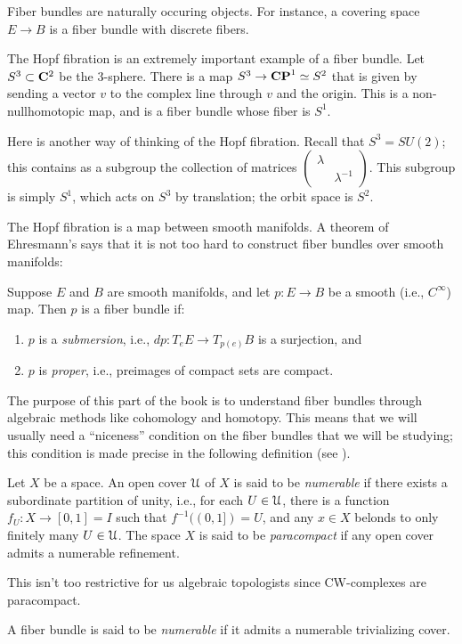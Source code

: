Fiber bundles are naturally occuring objects.
For instance, a covering space $E\to B$ is a fiber bundle with discrete fibers. 
\begin{example}
    The Hopf fibration is an extremely important example of a fiber bundle.
    Let $S^3\subset \mathbf C^2$ be the $3$-sphere.
    There is a map $S^3\to \mathbf{CP}^1 \simeq S^2$ that is given by sending a vector $v$ to the
    complex line through $v$ and the origin.
    This is a non-nullhomotopic map, and is a fiber bundle whose fiber is $S^1$.
    
    Here is another way of thinking of the Hopf fibration.
    Recall that $S^3 = SU(2)$; this contains as a subgroup
    the collection of matrices $\begin{pmatrix}\lambda & \\ & \lambda^{-1}\end{pmatrix}$.
	This subgroup is simply $S^1$, which acts on $S^3$ by translation; 
	the orbit space is $S^2$.
\end{example}
The Hopf fibration is a map between smooth manifolds.
A theorem of Ehresmann's says that it is not too hard to construct fiber bundles over smooth manifolds:
\begin{theorem}[Ehresmann]
    Suppose $E$ and $B$ are smooth manifolds, and let $p:E\to B$ be a smooth (i.e., $C^\infty$) map.
    Then $p$ is a fiber bundle if:
    \begin{enumerate}
	\item $p$ is a \emph{submersion}, i.e., $dp:T_e E\to T_{p(e)} B$ is a surjection, and
	\item $p$ is \emph{proper}, i.e., preimages of compact sets are compact.
    \end{enumerate}
\end{theorem}
The purpose of this part of the book is to understand fiber bundles through algebraic methods like cohomology and homotopy.
This means that we will usually need a ``niceness'' condition on the fiber bundles that we will be studying;
this condition is made precise in the following definition (see \cite{MayConcise}).
\begin{definition}
    Let $X$ be a space.
    An open cover $\mathcal U$ of $X$ is said to be \emph{numerable}
    if there exists a subordinate partition of unity, i.e.,
    for each $U\in\mathcal U$, there is a function $f_U:X\to [0,1]=I$
    such that $f^{-1}((0,1]) = U$,
    and any $x\in X$ belonds to only finitely many $U\in\mathcal U$.
    The space $X$ is said to be \emph{paracompact} if any open cover admits a numerable refinement.
\end{definition}
This isn't too restrictive for us algebraic topologists since CW-complexes are paracompact.
\begin{definition}
    A fiber bundle is said to be \emph{numerable} if it admits a numerable trivializing cover.
\end{definition}

